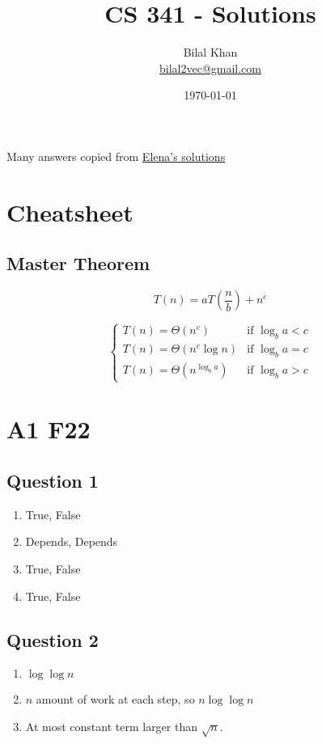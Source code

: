 \documentclass[11pt]{article}
\title{CS 341 - Solutions}
\author{Bilal Khan\\
\href{mailto:bilal2vec@gmail.com}{bilal2vec@gmail.com}}
\date{\today}
\begin{document}
\maketitle

Many answers copied from \href{https://github.com/elena-pan/UW-Practice-Problem-Solutions}{Elena's solutions}

\tableofcontents

\section{Cheatsheet}

\subsection{Master Theorem}

\[ T(n) = a T(\frac{n}{b}) + n^c \]

\[
    \begin{cases}
        T(n) = \Theta(n^c)          & \text{if } \log_b a < c \\
        T(n) = \Theta(n^c \log n)   & \text{if } \log_b a = c \\
        T(n) = \Theta(n^{\log_b a}) & \text{if } \log_b a > c
    \end{cases}
\]

\section{A1 F22}

\subsection{Question 1}

\begin{enumerate}
    \item True, False
    \item Depends, Depends
    \item True, False
    \item True, False
\end{enumerate}

\subsection{Question 2}

\begin{enumerate}
    \item $\log \log n$
    \item $n$ amount of work at each step, so $n \log \log n$
    \item At most constant term larger than $\sqrt{n}$.
\end{enumerate}
\end{document}
